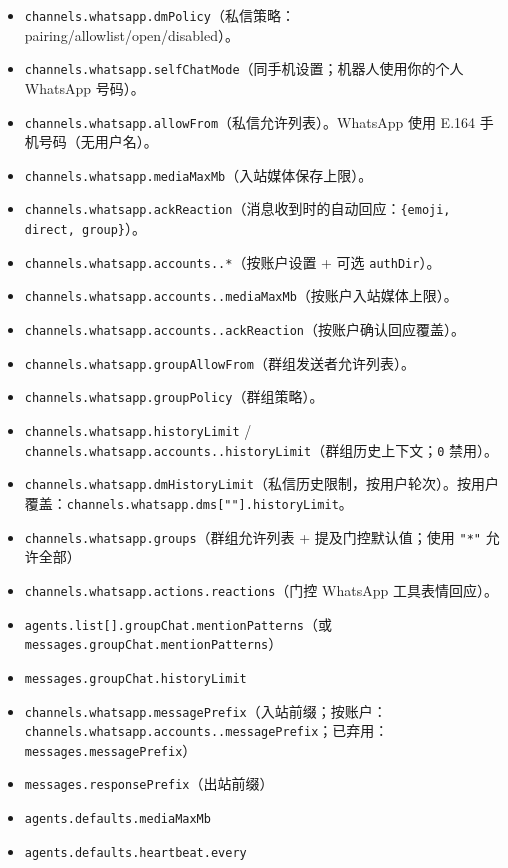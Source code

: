 \begin{itemize}
  \item \texttt{channels.whatsapp.dmPolicy}（私信策略：pairing/allowlist/open/disabled）。
  \item \texttt{channels.whatsapp.selfChatMode}（同手机设置；机器人使用你的个人 WhatsApp 号码）。
  \item \texttt{channels.whatsapp.allowFrom}（私信允许列表）。WhatsApp 使用 E.164 手机号码（无用户名）。
  \item \texttt{channels.whatsapp.mediaMaxMb}（入站媒体保存上限）。
  \item \texttt{channels.whatsapp.ackReaction}（消息收到时的自动回应：\texttt{\{emoji, direct, group\}}）。
  \item \texttt{channels.whatsapp.accounts..*}（按账户设置 + 可选 \texttt{authDir}）。
  \item \texttt{channels.whatsapp.accounts..mediaMaxMb}（按账户入站媒体上限）。
  \item \texttt{channels.whatsapp.accounts..ackReaction}（按账户确认回应覆盖）。
  \item \texttt{channels.whatsapp.groupAllowFrom}（群组发送者允许列表）。
  \item \texttt{channels.whatsapp.groupPolicy}（群组策略）。
  \item \texttt{channels.whatsapp.historyLimit} / \texttt{channels.whatsapp.accounts..historyLimit}（群组历史上下文；\texttt{0} 禁用）。
  \item \texttt{channels.whatsapp.dmHistoryLimit}（私信历史限制，按用户轮次）。按用户覆盖：\texttt{channels.whatsapp.dms[""].historyLimit}。
  \item \texttt{channels.whatsapp.groups}（群组允许列表 + 提及门控默认值；使用 \texttt{"*"} 允许全部）
  \item \texttt{channels.whatsapp.actions.reactions}（门控 WhatsApp 工具表情回应）。
  \item \texttt{agents.list[].groupChat.mentionPatterns}（或 \texttt{messages.groupChat.mentionPatterns}）
  \item \texttt{messages.groupChat.historyLimit}
  \item \texttt{channels.whatsapp.messagePrefix}（入站前缀；按账户：\texttt{channels.whatsapp.accounts..messagePrefix}；已弃用：\texttt{messages.messagePrefix}）
  \item \texttt{messages.responsePrefix}（出站前缀）
  \item \texttt{agents.defaults.mediaMaxMb}
  \item \texttt{agents.defaults.heartbeat.every}

\end{itemize}
